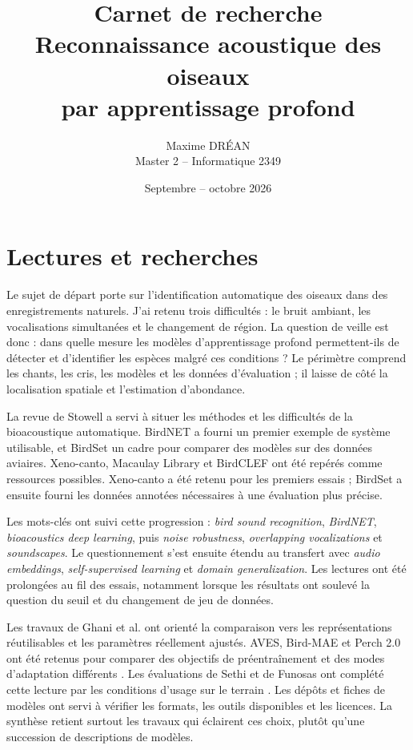 \documentclass[11pt,a4paper]{article}
\title{Carnet de recherche\\[0.3em]
\large Reconnaissance acoustique des oiseaux\\par apprentissage profond}
\author{Maxime DRÉAN\\\small Master 2 -- Informatique 2349}
\date{Septembre -- octobre 2026}
\begin{document}
\maketitle
\thispagestyle{fancy}

\section{Lectures et recherches}

Le sujet de départ porte sur l'identification automatique des oiseaux dans
des enregistrements naturels. J'ai retenu trois difficultés : le bruit ambiant,
les vocalisations simultanées et le changement de région. La question de veille
est donc : dans quelle mesure les modèles d'apprentissage profond permettent-ils
de détecter et d'identifier les espèces malgré ces conditions ? Le périmètre
comprend les chants, les cris, les modèles et les données d'évaluation ; il
laisse de côté la localisation spatiale et l'estimation d'abondance.

La revue de Stowell a servi à situer les méthodes et les difficultés de la
bioacoustique automatique\cite{stowell2022}. BirdNET a fourni un premier
exemple de système utilisable, et BirdSet un cadre pour comparer des modèles
sur des données aviaires\cite{kahl2021,birdset2025}. Xeno-canto, Macaulay
Library et BirdCLEF ont été repérés comme ressources possibles. Xeno-canto
a été retenu pour les premiers essais ; BirdSet a ensuite fourni les données
annotées nécessaires à une évaluation plus précise.

Les mots-clés ont suivi cette progression : \emph{bird sound recognition},
\emph{BirdNET}, \emph{bioacoustics deep learning}, puis \emph{noise robustness},
\emph{overlapping vocalizations} et \emph{soundscapes}. Le questionnement
s'est ensuite étendu au transfert avec \emph{audio embeddings},
\emph{self-supervised learning} et \emph{domain generalization}.
Les lectures ont été prolongées au fil des essais, notamment lorsque les
résultats ont soulevé la question du seuil et du changement de jeu de données.

Les travaux de Ghani et al. ont orienté la comparaison vers les représentations
réutilisables et les paramètres réellement ajustés\cite{ghani2023,ghani2025}.
AVES, Bird-MAE et Perch 2.0 ont été retenus pour comparer des objectifs de
préentraînement et des modes d'adaptation différents
\cite{aves2023,birdmae2025,perch2025}. Les évaluations de Sethi et de Funosas
ont complété cette lecture par les conditions d'usage sur le terrain
\cite{sethi2024,funosas2026}. Les dépôts et fiches de modèles ont servi à
vérifier les formats, les outils disponibles et les licences. La synthèse
retient surtout les travaux qui éclairent ces choix, plutôt qu'une succession
de descriptions de modèles.
\end{document}
